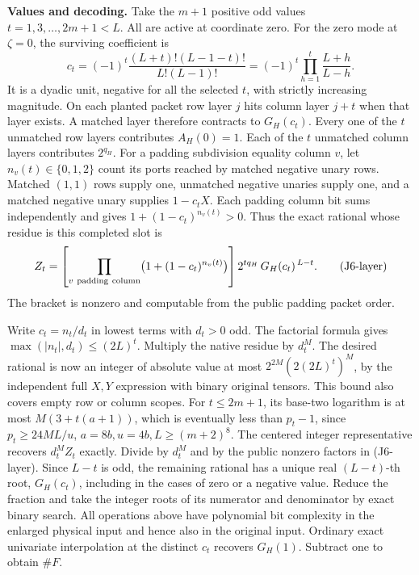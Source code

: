 \documentclass[11pt,a4paper]{article}
\begin{document}
\textbf{Values and decoding.} Take the \(m+1\) positive odd values
\(t=1,3,\ldots,2m+1<L\). All are active at coordinate zero. For the zero
mode at \(\zeta=0\), the surviving coefficient is \[
       c_t=(-1)^t \frac{(L+t)!(L-1-t)!}{L!(L-1)!}
           =(-1)^t\prod_{h=1}^t\frac{L+h}{L-h}.
\] It is a dyadic unit, negative for all the selected \(t\), with
strictly increasing magnitude. On each planted packet row layer \(j\)
hits column layer \(j+t\) when that layer exists. A matched layer
therefore contracts to \(G_H(c_t)\). Every one of the \(t\) unmatched
row layers contributes \(A_H(0)=1\). Each of the \(t\) unmatched column
layers contributes \(2^{q_H}\). For a padding subdivision equality
column \(v\), let \(n_v(t)\in\{0,1,2\}\) count its ports reached by
matched negative unary rows. Matched \((1,1)\) rows supply one,
unmatched negative unaries supply one, and a matched negative unary
supplies \(1-c_tX\). Each padding column bit sums independently and
gives \(1+(1-c_t)^{n_v(t)}>0\). Thus the exact rational whose residue is
this completed slot is \[
 Z_t=\left[\prod_{v\ {\rm padding\ column}}\bigl(1+(1-c_t)^{n_v(t)}\bigr)\right]
                 2^{tq_H}\,G_H(c_t)^{\,L-t}.                     \tag{J6-layer}
\] The bracket is nonzero and computable from the public padding packet
order.

Write \(c_t=n_t/d_t\) in lowest terms with \(d_t>0\) odd. The factorial
formula gives \(\max(|n_t|,d_t)\le(2L)^t\). Multiply the native residue
by \(d_t^M\). The desired rational is now an integer of absolute value
at most \(2^{2M}(2(2L)^t)^M\), by the independent full \(X,Y\)
expression with binary original tensors. This bound also covers empty
row or column scopes. For \(t\le2m+1\), its base-two logarithm is at
most \(M(3+t(a+1))\), which is eventually less than \(p_t-1\), since
\(p_t\ge24ML/u\), \(a=8b,u=4b,L\ge(m+2)^8\). The centered integer
representative recovers \(d_t^M Z_t\) exactly. Divide by \(d_t^M\) and
by the public nonzero factors in (J6-layer). Since \(L-t\) is odd, the
remaining rational has a unique real \((L-t)\)-th root, \(G_H(c_t)\),
including in the cases of zero or a negative value. Reduce the fraction
and take the integer roots of its numerator and denominator by exact
binary search. All operations above have polynomial bit complexity in
the enlarged physical input and hence also in the original input.
Ordinary exact univariate interpolation at the distinct \(c_t\) recovers
\(G_H(1)\). Subtract one to obtain \(\#F\).
\end{document}
